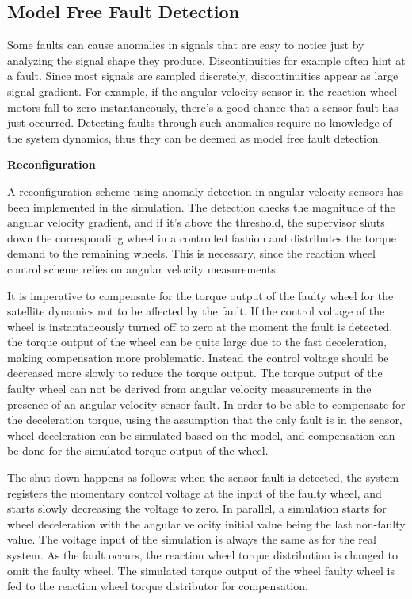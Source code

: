 \subsection{Model Free Fault Detection}
\label{sec:ModelFreeFD}

Some faults can cause anomalies in signals that are easy to notice just by analyzing the signal shape they produce. Discontinuities for example often hint at a fault. Since most signals are sampled discretely, discontinuities appear as large signal gradient. For example, if the angular velocity sensor in the reaction wheel motors fall to zero instantaneously, there's a good chance that a sensor fault has just occurred. Detecting faults through such anomalies require no knowledge of the system dynamics, thus they can be deemed as model free fault detection.

\textbf{Reconfiguration}

A reconfiguration scheme using anomaly detection in angular velocity sensors has been implemented in the simulation. The detection checks the magnitude of the angular velocity gradient, and if it's above the threshold, the supervisor shuts down the corresponding wheel in a controlled fashion and distributes the torque demand to the remaining wheels. This is necessary, since the reaction wheel control scheme relies on angular velocity measurements. 

It is imperative to compensate for the torque output of the faulty wheel for the satellite dynamics not to be affected by the fault. If the control voltage of the wheel is instantaneously turned off to zero at the moment the fault is detected, the torque output of the wheel can be quite large due to the fast deceleration, making compensation more problematic. Instead the control voltage should be decreased more slowly to reduce the torque output. The torque output of the faulty wheel can not be derived from angular velocity measurements in the presence of an angular velocity sensor fault. In order to be able to compensate for the deceleration torque, using the assumption that the only fault is in the sensor, wheel deceleration can be simulated based on the model, and compensation can be done for the simulated torque output of the wheel.

The shut down happens as follows: when the sensor fault is detected, the system registers the momentary control voltage at the input of the faulty wheel, and starts slowly decreasing the voltage to zero. In parallel, a simulation starts for wheel deceleration with the angular velocity initial value being the last non-faulty value. The voltage input of the simulation is always the same as for the real system. As the fault occurs, the reaction wheel torque distribution is changed to omit the faulty wheel. The simulated torque output of the wheel faulty wheel is fed to the reaction wheel torque distributor for compensation.